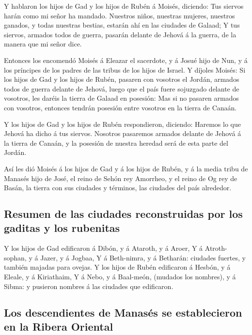 Y hablaron los hijos de Gad y los hijos de Rubén á Moisés,
diciendo: Tus siervos harán como mi señor ha mandado. 
Nuestros niños, nuestras mujeres, nuestros ganados, y todas nuestras
bestias, estarán ahí en las ciudades de Galaad;  Y tus
siervos, armados todos de guerra, pasarán delante de Jehová á la guerra,
de la manera que mi señor dice.

 Entonces los encomendó Moisés á Eleazar el sacerdote, y á
Josué hijo de Nun, y á los príncipes de los padres de las tribus de los
hijos de Israel.  Y díjoles Moisés: Si los hijos de Gad y
los hijos de Rubén, pasaren con vosotros el Jordán, armados todos de
guerra delante de Jehová, luego que el país fuere sojuzgado delante de
vosotros, les daréis la tierra de Galaad en posesión:  Mas
si no pasaren armados con vosotros, entonces tendrán posesión entre
vosotros en la tierra de Canaán.

 Y los hijos de Gad y los hijos de Rubén respondieron,
diciendo: Haremos lo que Jehová ha dicho á tus siervos. 
Nosotros pasaremos armados delante de Jehová á la tierra de Canaán, y la
posesión de nuestra heredad será de esta parte del Jordán.

 Así les dió Moisés á los hijos de Gad y á los hijos de
Rubén, y á la media tribu de Manasés hijo de José, el reino de Sehón rey
Amorrheo, y el reino de Og rey de Basán, la tierra con sus ciudades y
términos, las ciudades del país alrededor.

\hypertarget{resumen-de-las-ciudades-reconstruidas-por-los-gaditas-y-los-rubenitas}{%
\subsection{Resumen de las ciudades reconstruidas por los gaditas y los
rubenitas}\label{resumen-de-las-ciudades-reconstruidas-por-los-gaditas-y-los-rubenitas}}

 Y los hijos de Gad edificaron á Dibón, y á Ataroth, y á
Aroer,  Y á Atroth-sophan, y á Jazer, y á Jogbaa,
 Y á Beth-nimra, y á Betharán: ciudades fuertes, y también
majadas para ovejas.  Y los hijos de Rubén edificaron á
Hesbón, y á Eleale, y á Kiriathaim,  Y á Nebo, y á
Baal-meón, (mudados los nombres), y á Sibma: y pusieron nombres á las
ciudades que edificaron.

\hypertarget{los-descendientes-de-manasuxe9s-se-establecieron-en-la-ribera-oriental}{%
\subsection{Los descendientes de Manasés se establecieron en la Ribera
Oriental}\label{los-descendientes-de-manasuxe9s-se-establecieron-en-la-ribera-oriental}}

